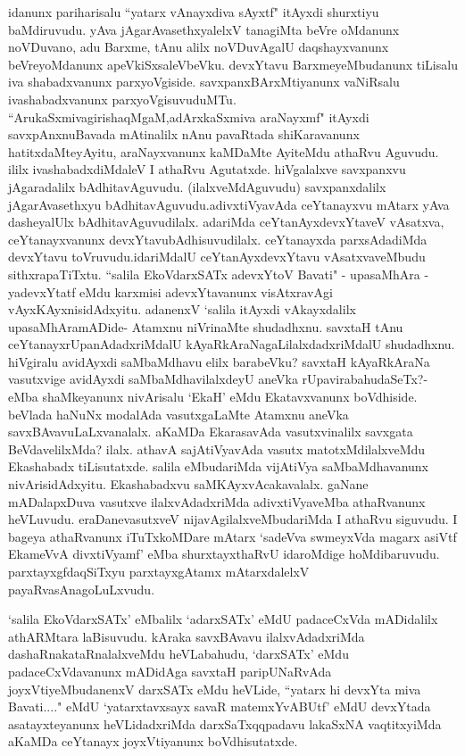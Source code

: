 \begin{artha}
idanunx pariharisalu ``yatarx vAnayxdiva sAyxtf" itAyxdi shurxtiyu baMdiruvudu. yAva jAgarAvasethxyalelxV tanagiMta beVre oMdanunx noVDuvano, adu Barxme, tAnu alilx noVDuvAgalU daqshayxvanunx beVreyoMdanunx apeVkiSxsaleVbeVku. devxYtavu BarxmeyeMbudanunx tiLisalu iva shabadxvanunx parxyoVgiside. savxpanxBArxMtiyanunx vaNiRsalu ivashabadxvanunx parxyoVgisuvuduMTu. ``ArukaSxmivagirishaqMgaM,\break adArxkaSxmiva araNayxmf" itAyxdi savxpAnxnuBavada mAtinalilx nAnu pavaRtada shiKaravanunx hatitxdaMteyAyitu, araNayxvanunx kaMDaMte AyiteMdu athaRvu Aguvudu. ililx ivashabadxdiMdaleV I athaRvu Agutatxde. hiVgalalxve savxpanxvu jAgaradalilx bAdhitavAguvudu. (ilalxveMdAguvudu) savxpanxdalilx jAgarAvasethxyu bAdhitavAguvudu.\break adivxtiVyavAda ceYtanayxvu mAtarx yAva dasheyalUlx bAdhitavAguvudilalx. adariMda ceYtanAyxdevxYtaveV vAsatxva, ceYtanayxvanunx devxYtavu\break bAdhisuvudilalx. ceYtanayxda parxsAdadiMda devxYtavu toVruvudu.\break idariMdalU ceYtanAyxdevxYtavu vAsatxvaveMbudu sithxrapaTiTxtu. ``salila EkoVdarxSATx adevxYtoV Bavati" - upasaMhAra - yadevxYtatf  eMdu karxmisi adevxYtavanunx visAtxravAgi vAyxKAyxnisidAdxyitu. adanenxV `salila itAyxdi vAkayxdalilx upasaMhAramADide- Atamxnu niVrinaMte shudadhxnu. savxtaH tAnu ceYtanayxrUpanAdadxriMdalU kAyaRkAraNagaLilalxdadxriMdalU shudadhxnu. hiVgiralu avidAyxdi saMbaMdhavu elilx barabeVku? savxtaH kAyaRkAraNa vasutxvige avidAyxdi saMbaMdhavilalxdeyU aneVka rUpavirabahudaSeTx?- eMba shaMkeyanunx nivArisalu `EkaH' eMdu Ekatavxvanunx boVdhiside. beVlada haNuNx modalAda vasutxgaLaMte Atamxnu aneVka savxBAvavuLaLxvanalalx. aKaMDa EkarasavAda vasutxvinalilx savxgata BeVdavelilxMda? ilalx. athavA sajAtiVyavAda vasutx matotxMdilalxveMdu Ekashabadx tiLisutatxde. salila eMbudariMda vijAtiVya saMbaMdhavanunx nivArisidAdxyitu. Ekashabadxvu saMKAyxvAcakavalalx. gaNane mADalapxDuva vasutxve ilalxvAdadxriMda adivxtiVyaveMba athaRvanunx heVLuvudu. eraDanevasutxveV nijavAgilalxveMbuda\-riMda I athaRvu siguvudu. I bageya athaRvanunx iTuTxkoMDare mAtarx `sadeVva swmeyxVda magarx asiVtf EkameVvA divxtiVyamf' eMba shurxtayxthaRvU idaroMdige hoMdibaruvudu. parxtayxgfdaqSiTxyu parxtayxgAtamx mAtarxdalelxV payaRvasAnagoLuLxvudu.
\end{artha}%

\begin{artha}
`salila EkoVdarxSATx' eMbalilx `adarxSATx' eMdU padaceCxVda mADidalilx athARMtara laBisuvudu. kAraka savxBAvavu ilalxvAdadxriMda dashaRnakataRnalalxveMdu heVLabahudu, `darxSATx' eMdu padaceCxVdavanunx mADidAga savxtaH paripUNaRvAda joyxVtiyeMbudanenxV darxSATx eMdu heVLide, ``yatarx hi devxYta miva Bavati...." eMdU `yatarxtavxsayx savaR matemxYvABUtf' eMdU devxYtada asatayxteyanunx heVLidadxriMda darxSaTxqqpadavu lakaSxNA vaqtitxyiMda aKaMDa ceYtanayx joyxVtiyanunx boVdhisutatxde. 
\end{artha}

